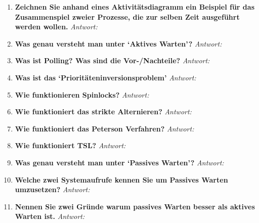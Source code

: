 \begin{enumerate}[label=\arabic*.]
      \item \textbf{Zeichnen Sie anhand eines Aktivitätsdiagramm ein Beispiel für das Zusammenspiel zweier
                  Prozesse, die zur selben Zeit ausgeführt werden wollen.} \newline
            \textit{Antwort:}

      \item \textbf{Was genau versteht man unter `Aktives Warten'?} \newline
            \textit{Antwort:}

      \item \textbf{Was ist Polling? Was sind die Vor-/Nachteile?} \newline
            \textit{Antwort:}

      \item \textbf{Was ist das `Prioritäteninversionsproblem'} \newline
            \textit{Antwort:}

      \item \textbf{Wie funktionieren Spinlocks?} \newline
            \textit{Antwort:}

      \item \textbf{Wie funktioniert das strikte Alternieren?} \newline
            \textit{Antwort:}

      \item \textbf{Wie funktioniert das Peterson Verfahren?} \newline
            \textit{Antwort:}

      \item \textbf{Wie funktioniert TSL?} \newline
            \textit{Antwort:}

      \item \textbf{Was genau versteht man unter `Passives Warten'?} \newline
            \textit{Antwort:}

      \item \textbf{Welche zwei Systemaufrufe kennen Sie um Passives Warten umzusetzen?} \newline
            \textit{Antwort:}

      \item \textbf{Nennen Sie zwei Gründe warum passives Warten besser als aktives Warten ist.} \newline
            \textit{Antwort:}


\end{enumerate}
